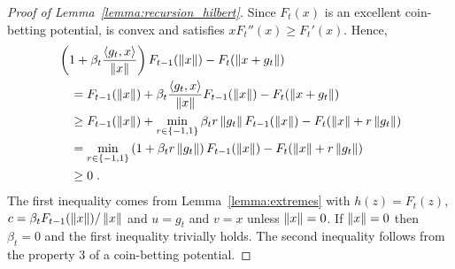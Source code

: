 \begin{proof}[Proof of Lemma~\ref{lemma:recursion_hilbert}]
Since $F_t(x)$ is an excellent coin-betting potential, is convex and satisfies $x
F_t''(x) \ge F_t'(x)$. Hence,
\begin{align*}
&\left(1 + \beta_t \frac{\langle g_t, x \rangle}{\|x\|} \right) F_{t-1}(\left\|{x}\right\|) - F_t(\left\|{x + g_t}\right\|) \\
&\quad = F_{t-1}(\left\|{x}\right\|) + \beta_t \frac{\langle g_t, x \rangle}{\|x\|} F_{t-1}(\left\|{x}\right\|) - F_t(\left\|{x + g_t}\right\|) \\
&\quad \ge F_{t-1}(\left\|{x}\right\|)+\min_{r \in \{-1,1\}} \beta_t r \left\|{g_t}\right\| F_{t-1}(\left\|{x}\right\|) - F_t(\left\|{x}\right\| + r \left\|{g_t}\right\|) \\
&\quad =\min_{r \in \{-1,1\}} \left(1 + \beta_t r \left\|{g_t}\right\|\right) F_{t-1}(\left\|{x}\right\|) - F_t(\left\|{x}\right\| + r \left\|{g_t}\right\|) \\
&\quad \ge 0 \; .
\end{align*}
The first inequality comes from Lemma~\ref{lemma:extremes} with $h(z) = F_t(z)$,
$c = \beta_t F_{t-1}(\left\|{x}\right\|) / \left\|{x}\right\|$ and $u=g_t$ and $v=x$ unless $\left\|{x}\right\| = 0$.
If $\left\|{x}\right\|=0$ then $\beta_t = 0$ and the first inequality trivially holds.
The second inequality follows from the property 3 of a coin-betting potential.
\end{proof}
